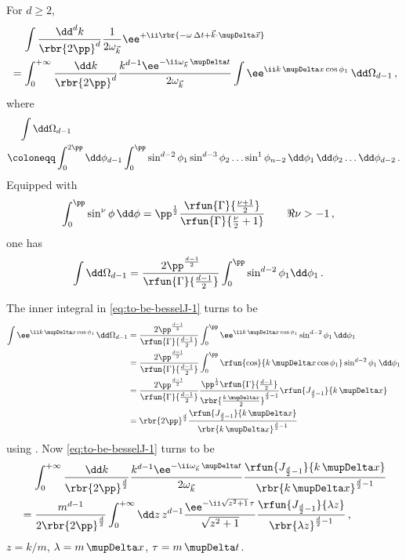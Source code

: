 \documentclass[a4paper]{article}
\numberwithin{equation}{section}
\begin{document}
For $d \ge 2$,
\begin{align}
&\quad\,
\int \frac{\dd^d k}{\rbr{2\pp}^d} \frac{1}{2\omega_{\vec{k}}}
\ee^{+\ii \rbr{-\omega\,\Delta t + \vec{k}\cdot\mupDelta\vec{x}}}
\nonumber \\
&=
\int_{0}^{+\infty} \frac{\dd k}{\rbr{2\pp}^d}
	\frac{k^{d-1}\ee^{-\ii \omega_{\vec{k}}\,\mupDelta t}}{2\omega_{\vec{k}}}
	\int \ee^{\ii k\,\mupDelta x \cos \phi_1}\,\dd\Omega_{d-1}\,,
\label{eq:to-be-besselJ-1}
\end{align}
where
\begin{align}
\begin{split}
&\quad\,
\int \dd\Omega_{d-1}
\\
&\coloneqq
	\int_{0}^{2\pp} \dd\phi_{d-1}
	\int_{0}^{\pp} \sin^{d-2}\phi_1\sin^{d-3}\phi_2 \ldots \sin^{1}\phi_{n-2}\,
		\dd \phi_{1}\,\dd\phi_{2}\ldots\dd\phi_{d-2}\,.
\end{split}
\end{align}
Equipped with
\begin{align}
\int_{0}^{\pp} \sin^{\nu}\phi\,\dd\phi &= \pp^{\frac{1}{2}}
	\frac{\rfun{\Gamma}{\frac{\nu + 1}{2}}}{\rfun{\Gamma}{\frac{\nu}{2} + 1}}
\qquad
\Re \nu > -1\,,
\end{align}
one has
\begin{align}
\int \dd\Omega_{d-1} &=
	\frac{2\pp^{\frac{d-1}{2}}}{\rfun{\Gamma}{\frac{d-1}{2}}}
	\int_{0}^{\pp} \sin^{d-2}\phi_1 \dd\phi_1\,.
\end{align}

The inner integral in \cref{eq:to-be-besselJ-1} turns to be
\begin{align}
\int \ee^{\ii k\,\mupDelta x \cos \phi_1}\,\dd\Omega_{d-1} &=
\frac{2\pp^{\frac{d-1}{2}}}{\rfun{\Gamma}{\frac{d-1}{2}}}
	\int_{0}^{\pp} \ee^{\ii k\,\mupDelta x \cos \phi_1}\sin^{d-2}\phi_1
		\,\dd\phi_1
\nonumber \\
&=
\frac{2\pp^{\frac{d-1}{2}}}{\rfun{\Gamma}{\frac{d-1}{2}}}
	\int_{0}^{\pp} \rfun{\cos}{k\,\mupDelta x \cos \phi_1}\sin^{d-2}\phi_1
		\,\dd\phi_1
\nonumber \\
&=
\frac{2\pp^{\frac{d-1}{2}}}{\rfun{\Gamma}{\frac{d-1}{2}}}
	\frac{\pp^{\frac{1}{2}} \rfun{\Gamma}{\frac{d-1}{2}}}%
		{\rbr{\frac{k\,\mupDelta x}{2}}^{\frac{d}{2}-1}}
	\rfun{J_{\frac{d}{2}-1}}{k\,\mupDelta x}
\nonumber \\
&=
\rbr{2\pp}^{\frac{d}{2}} \frac{\rfun{J_{\frac{d}{2}-1}}{k\,\mupDelta x}}%
	{\rbr{k\,\mupDelta x}^{{\frac{d}{2}-1}}}
\end{align}
using \cite[eq.\ (10.9.4)]{NIST:DLMF}. Now \cref{eq:to-be-besselJ-1} turns to 
be
\begin{align}
&\quad\,
\int_{0}^{+\infty} \frac{\dd k}{\rbr{2\pp}^{\frac{d}{2}}}
	\frac{k^{d-1}\ee^{-\ii \omega_{\vec{k}}\,\mupDelta t}}{2\omega_{\vec{k}}}
	\frac{\rfun{J_{\frac{d}{2}-1}}{k\,\mupDelta x}}%
	{\rbr{k\,\mupDelta x}^{{\frac{d}{2}-1}}}
\nonumber \\
&=
\frac{m^{d-1}}{2\rbr{2\pp}^{\frac{d}{2}}}
\int_{0}^{+\infty} \dd z\,z^{d-1}
	\frac{\ee^{-\ii \sqrt{z^2+1}\,\tau}}{\sqrt{z^2+1}}
	\frac{\rfun{J_{\frac{d}{2}-1}}{\lambda z}}%
	{\rbr{\lambda z}^{{\frac{d}{2}-1}}}\,,
\end{align}
$z = k/m$, $\lambda = m\,\mupDelta x$, $\tau = m\,\mupDelta t$.
\end{document}
